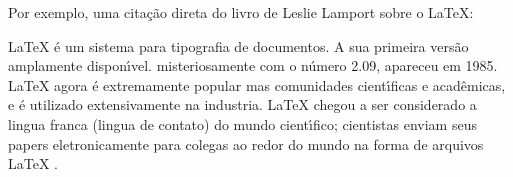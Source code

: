 Por exemplo, uma cita\c{c}\~{a}o direta do livro de Leslie Lamport sobre o \LaTeX{}:
    \begin{quoting}[rightmargin=0cm,leftmargin=4cm] \footnotesize 
    \LaTeX{} \'{e} um sistema para tipografia de documentos. A sua primeira vers\~{a}o amplamente dispon\'{\i}vel. misteriosamente com o n\'{u}mero 2.09, apareceu em 1985. \LaTeX{} agora \'{e} extremamente popular mas comunidades cient\'{\i}ficas e acad\^{e}micas, e \'{e} utilizado extensivamente na industria. \LaTeX{} chegou a ser considerado a lingua franca (lingua de contato) do mundo cient\'{\i}fico; cientistas enviam seus papers eletronicamente para colegas ao redor do mundo na forma de arquivos \LaTeX{} \cite{lamport1994}.
    \end{quoting}
    

